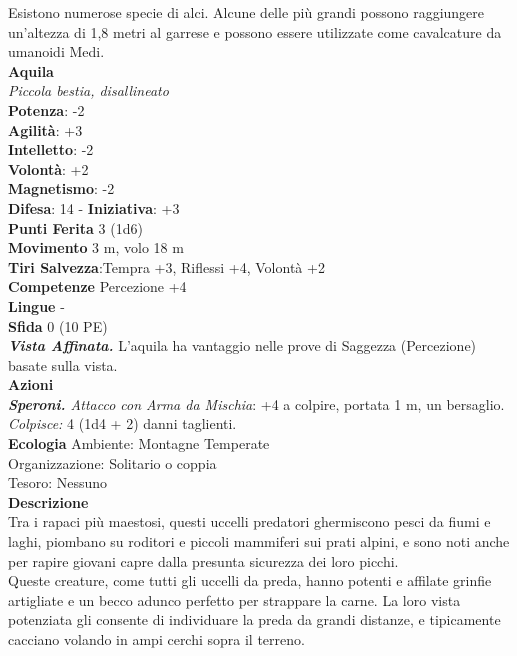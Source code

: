 \begin{multicols}{2}
Esistono numerose specie di alci. Alcune delle più grandi possono raggiungere un'altezza di 1,8 metri al garrese e possono essere utilizzate come cavalcature da umanoidi Medi.\\


\medskip\textbf{Aquila}\\
\emph{Piccola bestia, disallineato}\\
\textbf{Potenza}: -2\\
\textbf{Agilità}: +3\\
\textbf{Intelletto}: -2\\
\textbf{Volontà}: +2\\
\textbf{Magnetismo}: -2\\
\textbf{Difesa}: 14 - \textbf{Iniziativa}: +3\\
\textbf{Punti Ferita} 3 (1d6)\\
\textbf{Movimento} 3 m, volo 18 m\\
\textbf{Tiri Salvezza}:Tempra +3, Riflessi +4, Volontà +2\\
\textbf{Competenze} Percezione +4\\
\textbf{Lingue} -\\
\textbf{Sfida} 0 (10 PE)\smallskip\\
\emph{\textbf{Vista Affinata.}} L'aquila ha vantaggio nelle prove di Saggezza (Percezione) basate sulla vista.\\
\smallskip\textbf{Azioni}\\
\emph{\textbf{Speroni.} Attacco con Arma da Mischia}: +4 a colpire, portata 1 m, un bersaglio.\\
\emph{Colpisce:} 4 (1d4 + 2) danni taglienti.\\
\textbf{Ecologia}
Ambiente: Montagne Temperate\\
Organizzazione: Solitario o coppia\\
Tesoro: Nessuno\\
\textbf{Descrizione}\\
Tra i rapaci più maestosi, questi uccelli predatori ghermiscono pesci da fiumi e laghi, piombano su roditori e piccoli mammiferi sui prati alpini, e sono noti anche per rapire giovani capre dalla presunta sicurezza dei loro picchi.\\

Queste creature, come tutti gli uccelli da preda, hanno potenti e affilate grinfie artigliate e un becco adunco perfetto per strappare la carne. La loro vista potenziata gli consente di individuare la preda da grandi distanze, e tipicamente cacciano volando in ampi cerchi sopra il terreno.\\


\end{multicols}
